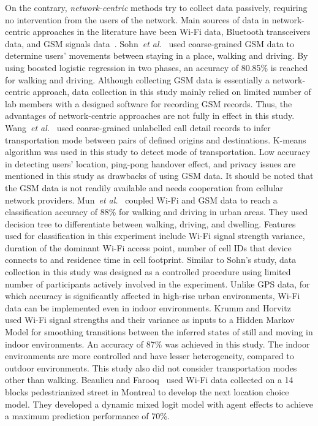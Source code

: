 On the contrary, \emph{network-centric} methods try to collect data passively, requiring no intervention from the users of the network. Main sources of data in network-centric approaches in the literature have been Wi-Fi data, Bluetooth transceivers data, and GSM signals data~\cite{sohn2006mobility,wang2010transportation,mun2008parsimonious,wang2010transportation}. Sohn~\textit{et al.}~\cite{sohn2006mobility} used coarse-grained GSM data to determine users' movements between staying in a place, walking and driving. By using boosted logistic regression in two phases, an accuracy of 80.85\% is reached for walking and driving. Although collecting GSM data is essentially a network-centric approach, data collection in this study mainly relied on limited number of lab members with a designed software for recording GSM records. Thus, the advantages of network-centric approaches are not fully in effect in this study. Wang~\textit{et al.}~\cite{wang2010transportation} used coarse-grained unlabelled call detail records to infer transportation mode between pairs of defined origins and destinations. K-means algorithm was used in this study to detect mode of transportation. Low accuracy in detecting users' location, ping-pong handover effect, and privacy issues are mentioned in this study as drawbacks of using GSM data. It should be noted that the GSM data is not readily available and needs cooperation from cellular network providers. Mun~\textit{et al.}~\cite{mun2008parsimonious} coupled Wi-Fi and GSM data to reach a classification accuracy of 88\% for walking and driving in urban areas. They used decision tree to differentiate between walking, driving, and dwelling. Features used for classification in this experiment include Wi-Fi signal strength variance, duration of the dominant Wi-Fi access point, number of cell IDs that device connects to and residence time in cell footprint. Similar to Sohn's study, data collection in this study was designed as a controlled procedure using limited number of participants actively involved in the experiment. Unlike GPS data, for which accuracy is significantly affected in high-rise urban environments, Wi-Fi data can be implemented even in indoor environments. Krumm and Horvitz~\cite{krumm2004locadio} used Wi-Fi signal strengths and their variance as inputs to a Hidden Markov Model for smoothing transitions between the inferred states of still and moving in indoor environments. An accuracy of 87\% was achieved in this study. The indoor environments are more controlled and have lesser heterogeneity, compared to outdoor environments. This study also did not consider transportation modes other than walking. Beaulieu and Farooq~\cite{beaulieu2019} used Wi-Fi data collected on a 14 blocks pedestrianized street in Montreal to develop the next location choice model. They developed a dynamic mixed logit model with agent effects to achieve a maximum prediction performance of 70\%.

